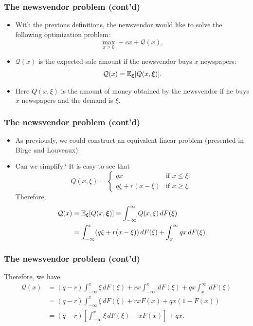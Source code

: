 \documentclass[aspectratio=169]{beamer}
\begin{document}
\begin{frame}
\frametitle{The newsvendor problem (cont'd)}

\begin{itemize}
\item
With the previous definitions, the newsvendor would like to solve the following optimization problem:
\[
\max_{x \geq 0} -cx + \mathcal{Q}(x),
\]
\item
$\mathcal{Q}(x)$ is the expected sale amount if the newsvendor buys $x$ newspapers:
\[
\mathcal{Q}(x) = {\mathbb{E}}_{{\boldsymbol{\xi}}} [ Q(x, {\boldsymbol{\xi}})].
\]
\item
Here $Q(x, \xi)$ is the amount of money obtained by the newsvendor if he buys $x$ newspapers and the demand is $\xi$.
\end{itemize}

\end{frame}

\begin{frame}
\frametitle{The newsvendor problem (cont'd)}

\begin{itemize}
\item
As previously, we could construct an equivalent linear problem (presented in Birge and Louveaux).
\item
Can we simplify? It is easy to see that
\[
Q(x, \xi) =
\begin{cases} 
qx & \mbox{if } x \leq \xi, \\
q\xi + r(x - \xi) & \mbox{if } x \geq \xi.
\end{cases}
\]
Therefore,
\begin{align*}
\mathcal{Q}(x) & = {\mathbb{E}}_{{\boldsymbol{\xi}}} [ Q(x, {\boldsymbol{\xi}}) ] =
\int_{-\infty}^{\infty} Q(x, \xi) \, dF(\xi) 
\\ & = \int_{-\infty}^x(q\xi + r(x - \xi)) \, dF(\xi) + \int^{\infty}_x
qx \, dF(\xi).
\end{align*}
\end{itemize}

\end{frame}

\begin{frame}
\frametitle{The newsvendor problem (cont'd)}

Therefore, we have
\begin{align*}
\mathcal{Q}(x) & = (q-r) \int_{-\infty}^x \xi \, dF(\xi) + rx
\int_{-\infty}^x \, dF(\xi) + qx \int_x^{\infty} \, dF(\xi) \\
& = (q-r) \int_{-\infty}^x \xi \, dF(\xi) + rx F(x) + qx (1-F(x)) \\
& = (q-r) \left[ \int_{-\infty}^x \xi \, dF(\xi) - x F(x) \right] + qx. \\
\end{align*}

\end{frame}
\end{document}

